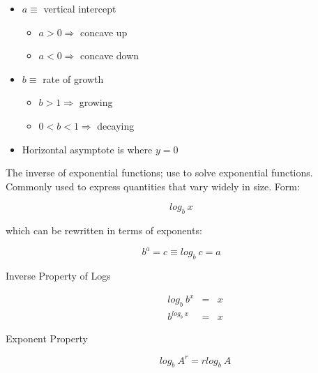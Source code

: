 \begin{itemize}
    \item $a \equiv$ vertical intercept
        \begin{itemize}
            \item $a > 0 \Rightarrow$ concave up
            \item $a < 0 \Rightarrow$ concave down
        \end{itemize}
    \item $b \equiv$ rate of growth
        \begin{itemize}
            \item $b > 1 \Rightarrow$ growing
            \item $0 < b < 1 \Rightarrow$ decaying
        \end{itemize}
    \item Horizontal asymptote is where $y = 0$
\end{itemize}
\hformbar




The inverse of exponential functions; use to solve exponential functions. Commonly used to express quantities that vary widely in size. Form:

\begin{equation}
    log_b~ x
\end{equation}

which can be rewritten in terms of exponents:

\begin{equation}
    b^a = c \equiv log_b~ c = a
\end{equation}

\begin{description}
    \item[Inverse Property of Logs] 
        \begin{eqnarray}
            log_b~ b^x &=& x \\
            b^{log_b~ x} &=& x
        \end{eqnarray}
        
    \item[Exponent Property]
        \begin{equation}
            log_b~ A^r = r log_b~ A
        \end{equation}
\end{description}



\newpage
